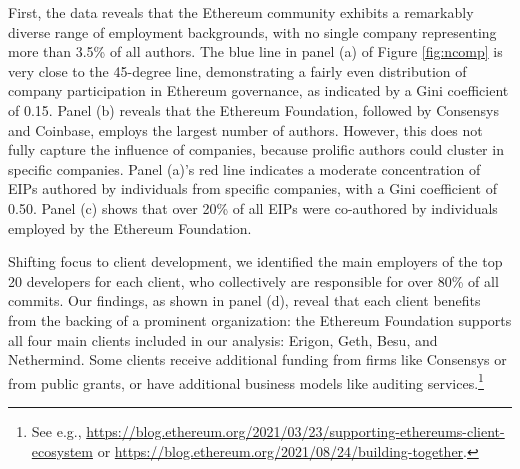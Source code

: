 \documentclass[No]{AEA}
\begin{document}
First, the data reveals that the Ethereum community exhibits a remarkably diverse range of employment backgrounds, with no single company representing more than 3.5\% of all authors. The blue line in panel (a) of Figure \ref{fig:ncomp} is very close to the 45-degree line, demonstrating a fairly even distribution of company participation in Ethereum governance, as indicated by a Gini coefficient of 0.15. Panel (b) reveals that the Ethereum Foundation, followed by Consensys and Coinbase, employs the largest number of authors. However, this does not fully capture the influence of companies, because prolific authors could cluster in specific companies. Panel (a)'s red line indicates a moderate concentration of EIPs authored by individuals from specific companies, with a Gini coefficient of 0.50. Panel (c) shows that over 20\% of all EIPs were co-authored by individuals employed by the Ethereum Foundation. 

Shifting focus to client development, we identified the main employers of the top 20 developers for each client, who collectively are responsible for over 80\% of all commits. Our findings, as shown in panel (d), reveal that each client benefits from the backing of a prominent organization: the Ethereum Foundation supports all four main clients included in our analysis: Erigon, Geth, Besu, and Nethermind. Some clients receive additional funding from firms like Consensys or from public grants, or have additional business models like auditing services.\footnote{See e.g., \url{https://blog.ethereum.org/2021/03/23/supporting-ethereums-client-ecosystem} or \url{https://blog.ethereum.org/2021/08/24/building-together}.}
\end{document}
